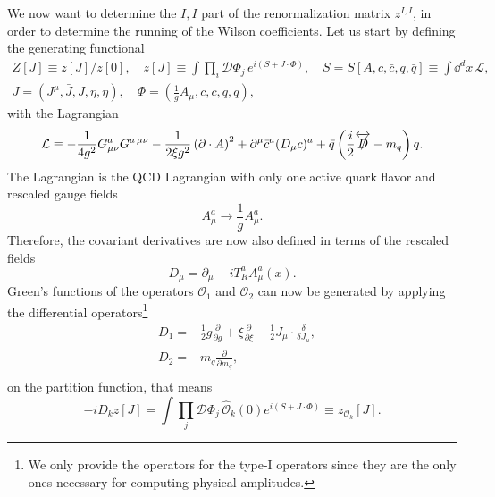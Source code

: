 We now want to determine the $I,I$ part of the renormalization matrix $z^{I,I}$, in order to determine the running of the Wilson coefficients. Let us start by defining the generating functional
\begin{equation}
\begin{gathered}
Z[J] \equiv z[J]/z[0], \quad z[J] \equiv \int \prod_i \mathcal{D} \Phi_j\, e^{i(S + J \cdot \Phi)}, \quad S = S[A, c, \bar{c}, q, \bar{q}] \equiv \int \dd^d x\, \mathcal{L}, \\
J = \left( J^\mu, \bar{J}, J, \bar{\eta}, \eta \right), \quad \Phi = \left(\frac{1}{g} A_\mu, c, \bar{c}, q, \bar{q}\right),
\end{gathered}
\end{equation}
with the Lagrangian
\begin{equation}
\mathcal{L} \equiv -\frac{1}{4g^2} G^a_{\mu\nu} G^{a \, \mu \nu} - \frac{1}{2 \xi g^2} \left(\partial \cdot A \right)^2 + \partial^\mu \bar{c}^a (D_\mu c)^a + \bar{q} \left(\frac{i}{2} \overleftrightarrow{\slashed{D}} - m_q \right) q.
\label{eq:4:rescaled_Lagrangian}
\end{equation}
The Lagrangian is the QCD Lagrangian with only one active quark flavor and rescaled gauge fields
\begin{equation}
A^a_\mu \longrightarrow \frac{1}{g} A^a_\mu.
\end{equation}
Therefore, the covariant derivatives are now also defined in terms of the rescaled fields
\begin{equation}
D_\mu = \partial_\mu - i T_R^a A^a_\mu (x).
\end{equation}
Green's functions of the operators $\mathcal{O}_1$ and $\mathcal{O}_2$ can now be generated by applying the differential operators\footnote{We only provide the operators for the type-I operators since they are the only ones necessary for computing physical amplitudes. }
\begin{equation}
\begin{split}
&D_1 = - \frac{1}{2}g \frac{\partial}{\partial g} + \xi \frac{\partial}{\partial \xi} - \frac{1}{2} J_\mu \cdot \frac{\delta}{\delta J_\mu}, \\
&D_2 = - m_q \frac{\partial}{\partial m_q}, \\
\end{split}
\label{eq:4:differential_operators}
\end{equation}
on the partition function, that means
\begin{equation}
- i D_k z[J] = \int \prod_j \mathcal{D} \Phi_j \, \hat{\mathcal{O}}_k(0) e^{i(S + J \cdot \Phi)} \equiv z_{\mathcal{O}_k}[J].
\end{equation}
